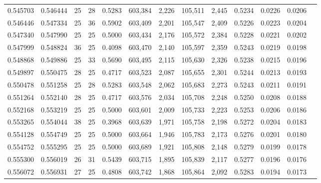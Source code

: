\begin{tabular}{rrrrrrrrrrrrr}
0.545703 & 0.546444 &    25 &  28 &                                     0.5283 & 603,384 &   2,226 & 105,511 &   2,445 & 0.5234 & 0.0226 & 0.0206 \\
0.546446 & 0.547334 &    25 &  36 &                                     0.5902 & 603,409 &   2,201 & 105,547 &   2,409 & 0.5226 & 0.0223 & 0.0204 \\
0.547340 & 0.547990 &    25 &  25 &                                     0.5000 & 603,434 &   2,176 & 105,572 &   2,384 & 0.5228 & 0.0221 & 0.0202 \\
0.547999 & 0.548824 &    36 &  25 &                                     0.4098 & 603,470 &   2,140 & 105,597 &   2,359 & 0.5243 & 0.0219 & 0.0198 \\
0.548868 & 0.549886 &    25 &  33 &                                     0.5690 & 603,495 &   2,115 & 105,630 &   2,326 & 0.5238 & 0.0215 & 0.0196 \\
0.549897 & 0.550475 &    28 &  25 &                                     0.4717 & 603,523 &   2,087 & 105,655 &   2,301 & 0.5244 & 0.0213 & 0.0193 \\
0.550478 & 0.551258 &    25 &  28 &                                     0.5283 & 603,548 &   2,062 & 105,683 &   2,273 & 0.5243 & 0.0211 & 0.0191 \\
0.551264 & 0.552140 &    28 &  25 &                                     0.4717 & 603,576 &   2,034 & 105,708 &   2,248 & 0.5250 & 0.0208 & 0.0188 \\
0.552168 & 0.553219 &    25 &  25 &                                     0.5000 & 603,601 &   2,009 & 105,733 &   2,223 & 0.5253 & 0.0206 & 0.0186 \\
0.553265 & 0.554044 &    38 &  25 &                                     0.3968 & 603,639 &   1,971 & 105,758 &   2,198 & 0.5272 & 0.0204 & 0.0183 \\
0.554128 & 0.554749 &    25 &  25 &                                     0.5000 & 603,664 &   1,946 & 105,783 &   2,173 & 0.5276 & 0.0201 & 0.0180 \\
0.554752 & 0.555295 &    25 &  25 &                                     0.5000 & 603,689 &   1,921 & 105,808 &   2,148 & 0.5279 & 0.0199 & 0.0178 \\
0.555300 & 0.556019 &    26 &  31 &                                     0.5439 & 603,715 &   1,895 & 105,839 &   2,117 & 0.5277 & 0.0196 & 0.0176 \\
0.556072 & 0.556931 &    27 &  25 &                                     0.4808 & 603,742 &   1,868 & 105,864 &   2,092 & 0.5283 & 0.0194 & 0.0173 \\

\end{tabular}
